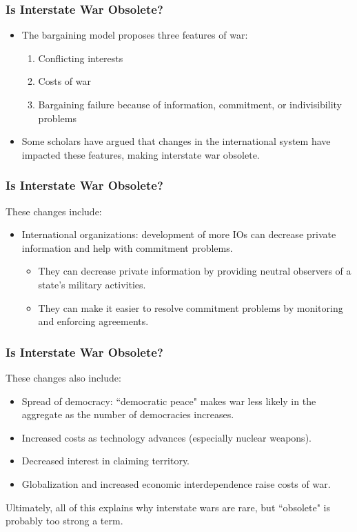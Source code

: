 \documentclass[handout]{beamer}
\begin{document}
\begin{frame} 
	\frametitle{\LARGE{Is Interstate War Obsolete?}}
	\begin{itemize}
		\item The bargaining model proposes three features of war: \pause 
		\begin{enumerate}
			\item Conflicting interests  
			\item Costs of war  
			\item Bargaining failure because of information, commitment, or indivisibility problems \pause
		\end{enumerate}
		\item Some scholars have argued that changes in the international system have impacted these features, making interstate war obsolete.
	\end{itemize}
\end{frame}

\begin{frame} 
	\frametitle{\LARGE{Is Interstate War Obsolete?}}
	These changes include:
	\begin{itemize}
		\item International organizations: development of more IOs can decrease private information and help with commitment problems. \pause
		\begin{itemize}
			\item They can decrease private information by providing neutral observers of a state’s military activities.
			\item They can make it easier to resolve commitment problems by monitoring and enforcing agreements.
		\end{itemize}
	\end{itemize}
\end{frame}

\begin{frame} 
	\frametitle{\LARGE{Is Interstate War Obsolete?}}
	These changes also include:
	\begin{itemize}
		\item Spread of democracy: ``democratic peace" makes war less likely in the aggregate as the number of democracies increases.
		\item Increased costs as technology advances (especially nuclear weapons). \pause
		\item Decreased interest in claiming territory. \pause
		\item Globalization and increased economic interdependence raise costs of war. \pause
	\end{itemize}
	Ultimately, all of this explains why interstate wars are rare, but ``obsolete" is probably too strong a term.
\end{frame}
\end{document}
